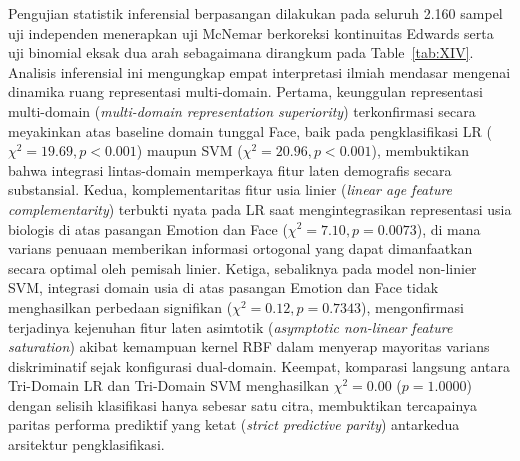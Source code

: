 Pengujian statistik inferensial berpasangan dilakukan pada seluruh 2.160 sampel uji independen menerapkan uji McNemar berkoreksi kontinuitas Edwards serta uji binomial eksak dua arah sebagaimana dirangkum pada Table~\ref{tab:XIV}. Analisis inferensial ini mengungkap empat interpretasi ilmiah mendasar mengenai dinamika ruang representasi multi-domain. Pertama, keunggulan representasi multi-domain (\textit{multi-domain representation superiority}) terkonfirmasi secara meyakinkan atas baseline domain tunggal Face, baik pada pengklasifikasi LR ($\chi^2 = 19.69, p < 0.001$) maupun SVM ($\chi^2 = 20.96, p < 0.001$), membuktikan bahwa integrasi lintas-domain memperkaya fitur laten demografis secara substansial. Kedua, komplementaritas fitur usia linier (\textit{linear age feature complementarity}) terbukti nyata pada LR saat mengintegrasikan representasi usia biologis di atas pasangan Emotion dan Face ($\chi^2 = 7.10, p = 0.0073$), di mana varians penuaan memberikan informasi ortogonal yang dapat dimanfaatkan secara optimal oleh pemisah linier. Ketiga, sebaliknya pada model non-linier SVM, integrasi domain usia di atas pasangan Emotion dan Face tidak menghasilkan perbedaan signifikan ($\chi^2 = 0.12, p = 0.7343$), mengonfirmasi terjadinya kejenuhan fitur laten asimtotik (\textit{asymptotic non-linear feature saturation}) akibat kemampuan kernel RBF dalam menyerap mayoritas varians diskriminatif sejak konfigurasi dual-domain. Keempat, komparasi langsung antara Tri-Domain LR dan Tri-Domain SVM menghasilkan $\chi^2 = 0.00$ ($p = 1.0000$) dengan selisih klasifikasi hanya sebesar satu citra, membuktikan tercapainya paritas performa prediktif yang ketat (\textit{strict predictive parity}) antarkedua arsitektur pengklasifikasi.

\begin{table}[htbp]
\caption{Paired Inferential Hypothesis Testing Across Multi-Domain Configurations.}
\label{tab:14}
\label{tab:XIV}
\centering
\footnotesize
{}
\end{table}

